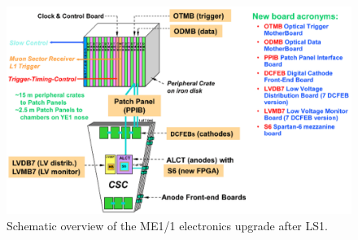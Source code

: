 \begin{figure}[b]
        \begin{center}
                \includegraphics[width=0.85\linewidth]{figures/ME11_upgrade_overview.png}
                \caption{Schematic overview of the ME1/1 electronics upgrade after LS1.}
                \label{fig:me11_upgrade_overview}
        \end{center}
\end{figure}